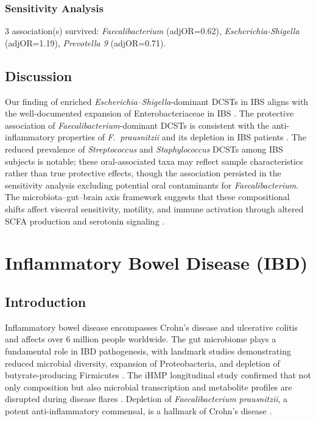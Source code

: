 \documentclass[11pt,a4paper]{article}
\begin{document}
\subsubsection{Sensitivity Analysis}
3 association(s) survived: \textit{Faecalibacterium} (adjOR=0.62), \textit{Escherichia-Shigella} (adjOR=1.19), \textit{Prevotella 9} (adjOR=0.71).

\subsection{Discussion}
Our finding of enriched \textit{Escherichia--Shigella}-dominant DCSTs in IBS aligns with the well-documented expansion of Enterobacteriaceae in IBS \cite{Pittayanon2019_IBS}. The protective association of \textit{Faecalibacterium}-dominant DCSTs is consistent with the anti-inflammatory properties of \textit{F.\ prausnitzii} and its depletion in IBS patients \cite{Sokol2008_Fprausnitzii}. The reduced prevalence of \textit{Streptococcus} and \textit{Staphylococcus} DCSTs among IBS subjects is notable; these oral-associated taxa may reflect sample characteristics rather than true protective effects, though the association persisted in the sensitivity analysis excluding potential oral contaminants for \textit{Faecalibacterium}. The microbiota--gut--brain axis framework suggests that these compositional shifts affect visceral sensitivity, motility, and immune activation through altered SCFA production and serotonin signaling \cite{Dinan2015_IBS,Cryan2012_gutbrain}.
\newpage

\section{Inflammatory Bowel Disease (IBD)}
\subsection{Introduction}
Inflammatory bowel disease encompasses Crohn's disease and ulcerative colitis and affects over 6 million people worldwide. The gut microbiome plays a fundamental role in IBD pathogenesis, with landmark studies demonstrating reduced microbial diversity, expansion of Proteobacteria, and depletion of butyrate-producing Firmicutes \cite{LloydPrice2019_IBD,Gevers2014_CD,Frank2007_IBD}. The iHMP longitudinal study confirmed that not only composition but also microbial transcription and metabolite profiles are disrupted during disease flares \cite{LloydPrice2019_IBD}. Depletion of \textit{Faecalibacterium prausnitzii}, a potent anti-inflammatory commensal, is a hallmark of Crohn's disease \cite{Sokol2008_Fprausnitzii,Manichanh2006_CD}.
\end{document}

